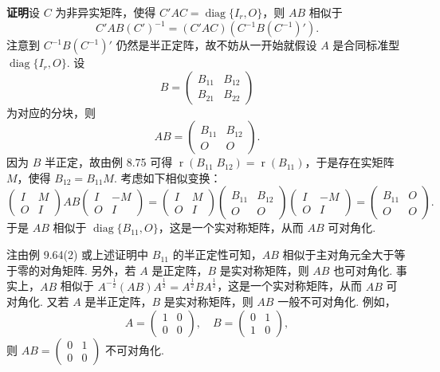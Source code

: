 \documentclass[UTF8, 12pt, fontset=fandol, oneside]{ctexart}
\begin{document}
\noindent\textbf{证明}\quad 设 $C$ 为非异实矩阵，使得 $C'AC=\operatorname{diag}\{I_r,O\}$，则 $AB$ 相似于
\[
C'AB(C')^{-1}=(C'AC)(C^{-1}B(C^{-1})').
\]
注意到 $C^{-1}B(C^{-1})'$ 仍然是半正定阵，故不妨从一开始就假设 $A$ 是合同标准型 $\operatorname{diag}\{I_r,O\}$. 设
\[
B=\begin{pmatrix}
B_{11}&B_{12}\\
B_{21}&B_{22}
\end{pmatrix}
\]
为对应的分块，则
\[
AB=\begin{pmatrix}
B_{11}&B_{12}\\
O&O
\end{pmatrix}.
\]
因为 $B$ 半正定，故由例 8.75 可得 $\operatorname{r}(B_{11}\;B_{12})=\operatorname{r}(B_{11})$，于是存在实矩阵 $M$，使得 $B_{12}=B_{11}M$. 考虑如下相似变换：
\[
\begin{pmatrix}
I&M\\
O&I
\end{pmatrix}
AB
\begin{pmatrix}
I&-M\\
O&I
\end{pmatrix}
=
\begin{pmatrix}
I&M\\
O&I
\end{pmatrix}
\begin{pmatrix}
B_{11}&B_{12}\\
O&O
\end{pmatrix}
\begin{pmatrix}
I&-M\\
O&I
\end{pmatrix}
=
\begin{pmatrix}
B_{11}&O\\
O&O
\end{pmatrix}.
\]
于是 $AB$ 相似于 $\operatorname{diag}\{B_{11},O\}$，这是一个实对称矩阵，从而 $AB$ 可对角化.

注\quad 由例 9.64(2) 或上述证明中 $B_{11}$ 的半正定性可知，$AB$ 相似于主对角元全大于等于零的对角矩阵. 另外，若 $A$ 是正定阵，$B$ 是实对称矩阵，则 $AB$ 也可对角化. 事实上，$AB$ 相似于 $A^{-\frac12}(AB)A^{\frac12}=A^{\frac12}BA^{\frac12}$，这是一个实对称矩阵，从而 $AB$ 可对角化. 又若 $A$ 是半正定阵，$B$ 是实对称矩阵，则 $AB$ 一般不可对角化. 例如，
\[
A=\begin{pmatrix}1&0\\0&0\end{pmatrix},\quad
B=\begin{pmatrix}0&1\\1&0\end{pmatrix},
\]
则 $AB=\begin{pmatrix}0&1\\0&0\end{pmatrix}$ 不可对角化.
\end{document}
